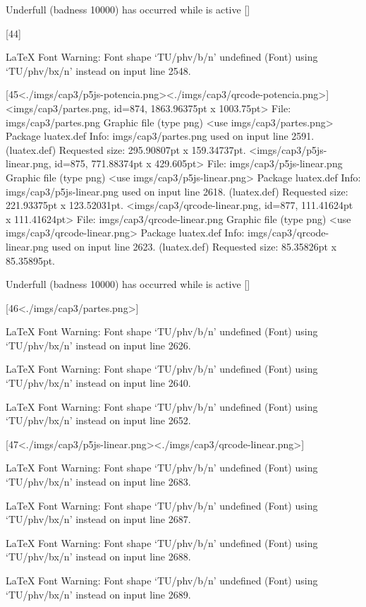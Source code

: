 Underfull \vbox (badness 10000) has occurred while \output is active []

[44]

LaTeX Font Warning: Font shape `TU/phv/b/n' undefined
(Font)              using `TU/phv/bx/n' instead on input line 2548.

[45<./imgs/cap3/p5js-potencia.png><./imgs/cap3/qrcode-potencia.png>]
<imgs/cap3/partes.png, id=874, 1863.96375pt x 1003.75pt>
File: imgs/cap3/partes.png Graphic file (type png)
<use imgs/cap3/partes.png>
Package luatex.def Info: imgs/cap3/partes.png  used on input line 2591.
(luatex.def)             Requested size: 295.90807pt x 159.34737pt.
<imgs/cap3/p5js-linear.png, id=875, 771.88374pt x 429.605pt>
File: imgs/cap3/p5js-linear.png Graphic file (type png)
<use imgs/cap3/p5js-linear.png>
Package luatex.def Info: imgs/cap3/p5js-linear.png  used on input line 2618.
(luatex.def)             Requested size: 221.93375pt x 123.52031pt.
<imgs/cap3/qrcode-linear.png, id=877, 111.41624pt x 111.41624pt>
File: imgs/cap3/qrcode-linear.png Graphic file (type png)
<use imgs/cap3/qrcode-linear.png>
Package luatex.def Info: imgs/cap3/qrcode-linear.png  used on input line 2623.
(luatex.def)             Requested size: 85.35826pt x 85.35895pt.

Underfull \vbox (badness 10000) has occurred while \output is active []

[46<./imgs/cap3/partes.png>]

LaTeX Font Warning: Font shape `TU/phv/b/n' undefined
(Font)              using `TU/phv/bx/n' instead on input line 2626.


LaTeX Font Warning: Font shape `TU/phv/b/n' undefined
(Font)              using `TU/phv/bx/n' instead on input line 2640.


LaTeX Font Warning: Font shape `TU/phv/b/n' undefined
(Font)              using `TU/phv/bx/n' instead on input line 2652.

[47<./imgs/cap3/p5js-linear.png><./imgs/cap3/qrcode-linear.png>]

LaTeX Font Warning: Font shape `TU/phv/b/n' undefined
(Font)              using `TU/phv/bx/n' instead on input line 2683.


LaTeX Font Warning: Font shape `TU/phv/b/n' undefined
(Font)              using `TU/phv/bx/n' instead on input line 2687.


LaTeX Font Warning: Font shape `TU/phv/b/n' undefined
(Font)              using `TU/phv/bx/n' instead on input line 2688.


LaTeX Font Warning: Font shape `TU/phv/b/n' undefined
(Font)              using `TU/phv/bx/n' instead on input line 2689.


